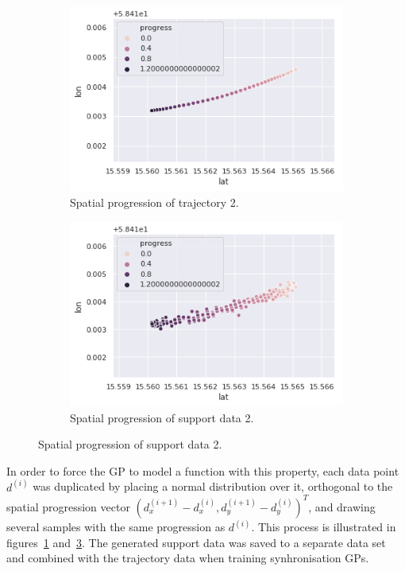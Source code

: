 \begin{figure}[H]
  \begin{subfigure}[b]{0.5\textwidth}
    \includegraphics[width=\textwidth]{figures/traj-without-support-data.png}
    \caption{Spatial progression of trajectory 2.}
    \label{fig:traj-without-support-data}
  \end{subfigure}
  \begin{subfigure}[b]{0.5\textwidth}
    \includegraphics[width=\textwidth]{figures/traj-with-support-data.png}
    \caption{Spatial progression of support data 2.}
    \label{fig:traj-with-support-data}
  \end{subfigure}
\end{figure}

In order to force the GP to model a function with this property, each data point $d^{(i)}$ was duplicated by placing a normal distribution over it, orthogonal to the spatial progression vector ${(d^{(i+1)}_x - d^{(i)}_x, d^{(i+1)}_y - d^{(i)}_y)}^T$, and drawing several samples with the same progression as $d^{(i)}$. This process is illustrated in figures~\ref{fig:traj-without-support-data} and~\ref{fig:traj-with-support-data}. The generated support data was saved to a separate data set and combined with the trajectory data when training synhronisation GPs.

